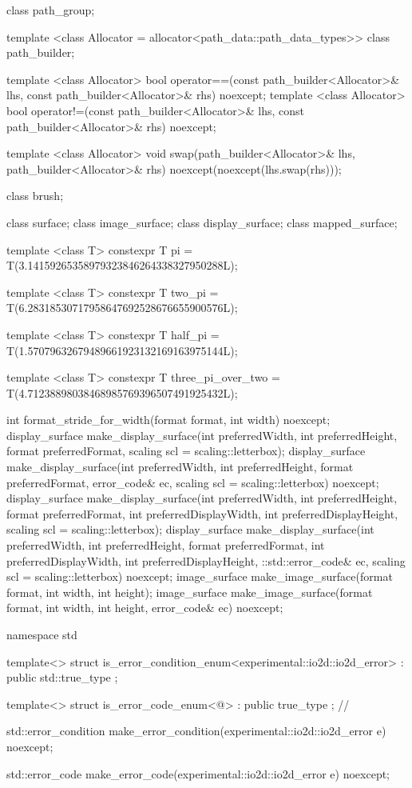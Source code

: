 \begin{codeblock}
{{{{  class path_group;

  template <class Allocator = allocator<path_data::path_data_types>>
  class path_builder;

  template <class Allocator>
  bool operator==(const path_builder<Allocator>& lhs, 
    const path_builder<Allocator>& rhs) noexcept;
  template <class Allocator>
  bool operator!=(const path_builder<Allocator>& lhs, 
    const path_builder<Allocator>& rhs) noexcept;
  
  template <class Allocator>
  void swap(path_builder<Allocator>& lhs, path_builder<Allocator>& rhs)
    noexcept(noexcept(lhs.swap(rhs)));
  
  class brush;
  
  class surface;
  class image_surface;
  class display_surface;
  class mapped_surface;
  
  template <class T>
  constexpr T pi = T(3.14159265358979323846264338327950288L);
  
  template <class T>
  constexpr T two_pi = T(6.28318530717958647692528676655900576L);
  
  template <class T>
  constexpr T half_pi = T(1.57079632679489661923132169163975144L);
  
  template <class T>
  constexpr T three_pi_over_two = T(4.71238898038468985769396507491925432L);
  
  int format_stride_for_width(format format, int width) noexcept;
  display_surface make_display_surface(int preferredWidth,
    int preferredHeight, format preferredFormat,
    scaling scl = scaling::letterbox);
  display_surface make_display_surface(int preferredWidth,
    int preferredHeight, format preferredFormat, error_code& ec,
    scaling scl = scaling::letterbox) noexcept;
  display_surface make_display_surface(int preferredWidth,
    int preferredHeight, format preferredFormat, int preferredDisplayWidth, 
    int preferredDisplayHeight, scaling scl = scaling::letterbox);
  display_surface make_display_surface(int preferredWidth,
    int preferredHeight, format preferredFormat, int preferredDisplayWidth, 
    int preferredDisplayHeight, ::std::error_code& ec,
    scaling scl = scaling::letterbox) noexcept;
  image_surface make_image_surface(format format, int width, int height);
  image_surface make_image_surface(format format, int width, int height, 
    error_code& ec) noexcept;
} } } }

namespace std {
  template<>
  struct is_error_condition_enum<experimental::io2d::io2d_error>
    : public std::true_type{ };

  template<>
  struct is_error_code_enum<@\impdef@>
    : public true_type{ }; // \expos

  std::error_condition make_error_condition(experimental::io2d::io2d_error e) 
    noexcept;

  std::error_code make_error_code(experimental::io2d::io2d_error e) noexcept;
}

\end{codeblock}
%
